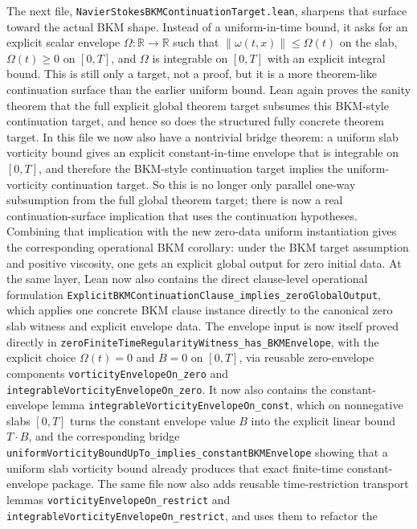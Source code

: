 \documentclass[11pt]{article}
\begin{document}
The next file, \texttt{NavierStokesBKMContinuationTarget.lean}, sharpens that
surface toward the actual BKM shape.  Instead of a uniform-in-time bound, it
asks for an explicit scalar envelope \(\Omega : \mathbb{R} \to \mathbb{R}\)
such that \(\|\omega(t,x)\| \le \Omega(t)\) on the slab, \(\Omega(t) \ge 0\) on
\([0,T]\), and \(\Omega\) is integrable on \([0,T]\) with an explicit integral
bound.  This is still only a target, not a proof, but it is a more theorem-like
continuation surface than the earlier uniform bound.  Lean again proves the
sanity theorem that the full explicit global theorem target subsumes this
BKM-style continuation target, and hence so does the structured fully concrete
theorem target.  In this file we now also have a nontrivial bridge theorem:
a uniform slab vorticity bound gives an explicit constant-in-time envelope that
is integrable on \([0,T]\), and therefore the BKM-style continuation target
implies the uniform-vorticity continuation target.  So this is no longer only
parallel one-way subsumption from the full global theorem target; there is now a
real continuation-surface implication that uses the continuation hypotheses.
Combining that implication with the new zero-data uniform instantiation gives
the corresponding operational BKM corollary: under the BKM target assumption and
positive viscosity, one gets an explicit global output for zero initial data.
At the same layer, Lean now also contains the direct clause-level operational
formulation \texttt{ExplicitBKMContinuationClause\_implies\_zeroGlobalOutput},
which applies one concrete BKM clause instance directly to the canonical zero
slab witness and explicit envelope data.  The envelope input is now itself
proved directly in
\texttt{zeroFiniteTimeRegularityWitness\_has\_BKMEnvelope}, with the explicit
choice \(\Omega(t)=0\) and \(B=0\) on \([0,T]\), via reusable zero-envelope
components \texttt{vorticityEnvelopeOn\_zero} and
\texttt{integrableVorticityEnvelopeOn\_zero}.  It now also contains the
constant-envelope lemma
\texttt{integrableVorticityEnvelopeOn\_const}, which on nonnegative slabs
\([0,T]\) turns the constant envelope value \(B\) into the explicit linear bound
\(T \cdot B\), and the corresponding bridge
\texttt{uniformVorticityBoundUpTo\_implies\_constantBKMEnvelope} showing that a
uniform slab vorticity bound already produces that exact finite-time
constant-envelope package.  The same file now also adds
reusable time-restriction transport lemmas
\texttt{vorticityEnvelopeOn\_restrict} and
\texttt{integrableVorticityEnvelopeOn\_restrict}, and uses them to refactor the
\end{document}
